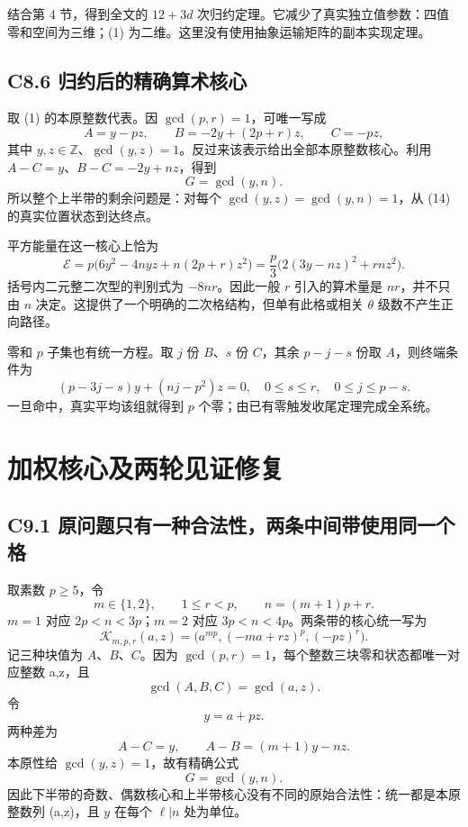 \documentclass[11pt,a4paper]{article}
\theoremstyle{definition}
\numberwithin{equation}{section}
\begin{document}
{结合第} {4} {节，得到全文的} \(12+3d\) {次归约定理。它减少了真实独立值参数：四值零和空间为三维；(1)} {为二维。这里没有使用抽象运输矩阵的副本实现定理。}

\subsection*{\texorpdfstring{{C8.6} {归约后的精确算术核心}}{C8.6 归约后的精确算术核心}}\label{C8-h58}

{取} {(1)} {的本原整数代表。因} \(\gcd(p,r)=1\){，可唯一写成} \[
A=y-pz,\qquad B=-2y+(2p+r)z,\qquad C=-pz,
\tag{C8.14}
\] {其中} \(y,z\in\mathbb Z\){、}\(\gcd(y,z)=1\){。反过来该表示给出全部本原整数核心。利用} \(A-C=y\){、}\(B-C=-2y+nz\){，得到} \[
\boxed{G=\gcd(y,n).}
\tag{C8.15}
\] {所以整个上半带的剩余问题是：对每个} \(\gcd(y,z)=\gcd(y,n)=1\){，从} {(14)} {的真实位置状态到达终点。}

{平方能量在这一核心上恰为} \[
\mathcal E
=p\bigl(6y^2-4nyz+n(2p+r)z^2\bigr)
=\frac p3\bigl(2(3y-nz)^2+rnz^2\bigr).
\tag{C8.16}
\] {括号内二元整二次型的判别式为} \(-8nr\){。因此一般} \(r\) {引入的算术量是} \(nr\){，并不只由} \(n\) {决定。这提供了一个明确的二次格结构，但单有此格或相关} {\ensuremath{\theta }} {级数不产生正向路径。}

{零和} \(p\) {子集也有统一方程。取} \(j\) {份} \(B\){、}\(s\) {份} \(C\){，其余} \(p-j-s\) {份取} \(A\){，则终端条件为} \[
\boxed{(p-3j-s)y+(nj-p^2)z=0,\quad
0\le s\le r,\quad 0\le j\le p-s.}
\tag{C8.17}
\] {一旦命中，真实平均该组就得到} \(p\) {个零；由已有零触发收尾定理完成全系统。}


\section{加权核心及两轮见证修复}\label{construct:core-entry}
\subsection*{\texorpdfstring{{C9.1} {原问题只有一种合法性，两条中间带使用同一个格}}{C9.1 原问题只有一种合法性，两条中间带使用同一个格}}\label{C9-h59}

{取素数} {\ensuremath{p\ge 5}，令} \[
m\in\{1,2\},\qquad 1\le r<p,\qquad n=(m+1)p+r.
\] {\ensuremath{m=1}} {对应} {\ensuremath{2p<n<3p}；\ensuremath{m=2}} {对应} {\ensuremath{3p<n<4p}。两条带的核心统一写为} \[
\boxed{\mathcal K_{m,p,r}(a,z)=
\bigl(a^{mp},(-ma+rz)^p,(-pz)^r\bigr).}
\tag{C9.1}
\] {记三种块值为} {\ensuremath{A}、\ensuremath{B}、\ensuremath{C}。因为} {\ensuremath{\operatorname{gcd}(p,r)=1}，每个整数三块零和状态都唯一对应整数} {a,z，且} \[
\gcd(A,B,C)=\gcd(a,z).
\] {令} \[
y=a+pz.
\] {两种差为} \[
A-C=y,\qquad A-B=(m+1)y-nz.
\] {本原性给} {\ensuremath{\operatorname{gcd}(y,z)=1}，故有精确公式} \[
\boxed{G=\gcd(y,n).}
\tag{C9.2}
\] {因此下半带的奇数、偶数核心和上半带核心没有不同的原始合法性：统一都是本原整数列} {(a,z)，且} {\ensuremath{y}} {在每个} {\ensuremath{\ell |n}} {处为单位。}
\end{document}
